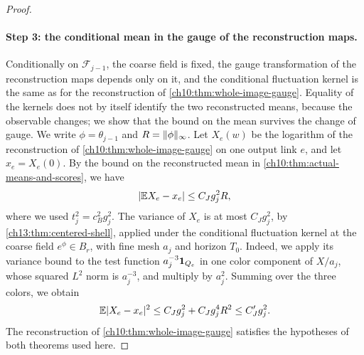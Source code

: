 \begin{proof}
\paragraph{Step 3: the conditional mean in the gauge of the reconstruction maps.}
Conditionally on $\mathcal F_{j-1}$, the coarse field is fixed, the gauge transformation of the reconstruction maps depends only on it, and the conditional fluctuation kernel is the same as for the reconstruction of \cref{ch10:thm:whole-image-gauge}. Equality of the kernels does not by itself identify the two reconstructed means, because the observable changes; we show that the bound on the mean survives the change of gauge. We write $\phi=\theta_{j-1}$ and $R=\lVert \phi\rVert_\infty$. Let $X_e(w)$ be the logarithm of the reconstruction of \cref{ch10:thm:whole-image-gauge} on one output link $e$, and let $x_e=X_e(0)$. By the bound on the reconstructed mean in \cref{ch10:thm:actual-means-and-scores}, we have
\[
 \lvert \mathbb E X_e-x_e\rvert\le C_Jg_j^2R,
\]
where we used $t_j^2=c_B^2g_j^2$. The variance of $X_e$ is at most $C_Jg_j^2$, by \cref{ch13:thm:centered-shell}, applied under the conditional fluctuation kernel at the coarse field $e^\phi\in B_r$, with fine mesh $a_j$ and horizon $T_0$. Indeed, we apply its variance bound to the test function $a_j^{-3}\mathbf 1_{Q_e}$ in one color component of $X/a_j$, whose squared $L^2$ norm is $a_j^{-3}$, and multiply by $a_j^2$. Summing over the three colors, we obtain
\begin{equation}\label{ch14:eq:original-second-moment}
 \mathbb E\lvert X_e-x_e\rvert^2\le C_Jg_j^2+C_Jg_j^4R^2\le C_J'g_j^2.
\end{equation}
The reconstruction of \cref{ch10:thm:whole-image-gauge} satisfies the hypotheses of both theorems used here.


\end{proof}
